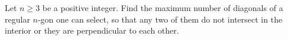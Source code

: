 Let $n \geq 3$ be a positive integer. Find the maximum number of diagonals of a regular $n$-gon one can select, so that any two of them do not intersect in the interior or they are perpendicular to each other.
